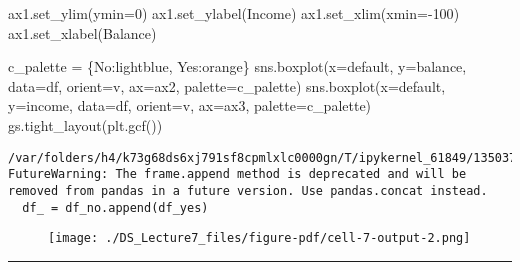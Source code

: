 \documentclass[
  letterpaper,
  DIV=11,
  numbers=noendperiod]{scrreprt}
\newenvironment{Shaded}{\begin{snugshade}}{\end{snugshade}}
\newcommand{\DecValTok}[1]{\textcolor[rgb]{0.68,0.00,0.00}{#1}}
\newcommand{\NormalTok}[1]{\textcolor[rgb]{0.00,0.23,0.31}{#1}}
\newcommand{\OperatorTok}[1]{\textcolor[rgb]{0.37,0.37,0.37}{#1}}
\newcommand{\StringTok}[1]{\textcolor[rgb]{0.13,0.47,0.30}{#1}}
\begin{document}
\begin{Shaded}
\begin{Highlighting}[]
\NormalTok{ax1.set\_ylim(ymin}\OperatorTok{=}\DecValTok{0}\NormalTok{)}
\NormalTok{ax1.set\_ylabel(}\StringTok{\textquotesingle{}Income\textquotesingle{}}\NormalTok{)}
\NormalTok{ax1.set\_xlim(xmin}\OperatorTok{={-}}\DecValTok{100}\NormalTok{)}
\NormalTok{ax1.set\_xlabel(}\StringTok{\textquotesingle{}Balance\textquotesingle{}}\NormalTok{)}

\NormalTok{c\_palette }\OperatorTok{=}\NormalTok{ \{}\StringTok{\textquotesingle{}No\textquotesingle{}}\NormalTok{:}\StringTok{\textquotesingle{}lightblue\textquotesingle{}}\NormalTok{, }\StringTok{\textquotesingle{}Yes\textquotesingle{}}\NormalTok{:}\StringTok{\textquotesingle{}orange\textquotesingle{}}\NormalTok{\}}
\NormalTok{sns.boxplot(x}\OperatorTok{=}\StringTok{\textquotesingle{}default\textquotesingle{}}\NormalTok{, y}\OperatorTok{=}\StringTok{\textquotesingle{}balance\textquotesingle{}}\NormalTok{, data}\OperatorTok{=}\NormalTok{df, orient}\OperatorTok{=}\StringTok{\textquotesingle{}v\textquotesingle{}}\NormalTok{, ax}\OperatorTok{=}\NormalTok{ax2, palette}\OperatorTok{=}\NormalTok{c\_palette)}
\NormalTok{sns.boxplot(x}\OperatorTok{=}\StringTok{\textquotesingle{}default\textquotesingle{}}\NormalTok{, y}\OperatorTok{=}\StringTok{\textquotesingle{}income\textquotesingle{}}\NormalTok{, data}\OperatorTok{=}\NormalTok{df, orient}\OperatorTok{=}\StringTok{\textquotesingle{}v\textquotesingle{}}\NormalTok{, ax}\OperatorTok{=}\NormalTok{ax3, palette}\OperatorTok{=}\NormalTok{c\_palette)}
\NormalTok{gs.tight\_layout(plt.gcf())}
\end{Highlighting}
\end{Shaded}

\begin{verbatim}
/var/folders/h4/k73g68ds6xj791sf8cpmlxlc0000gn/T/ipykernel_61849/1350372965.py:11: FutureWarning: The frame.append method is deprecated and will be removed from pandas in a future version. Use pandas.concat instead.
  df_ = df_no.append(df_yes)
\end{verbatim}

\begin{figure}[H]

{\centering \texttt{[image: ./DS\_Lecture7\_files/figure-pdf/cell-7-output-2.png]}

}

\end{figure}

\begin{center}\rule{0.5\linewidth}{0.5pt}\end{center}
\end{document}
